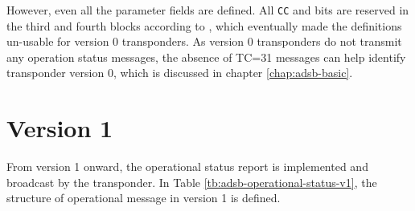 However, even all the parameter fields are defined. All 
\texttt{CC} and  bits are reserved in the third and fourth blocks according to \cite{icao9871v1}, which eventually made the definitions un-usable for version 0 transponders. As version 0 transponders do not transmit any operation status messages, the absence of TC=31 messages can help identify transponder version 0, which is discussed in chapter \ref{chap:adsb-basic}.

\section{Version 1}

From version 1 onward, the operational status report is implemented and broadcast by the transponder. In Table \ref{tb:adsb-operational-status-v1}, the structure of operational message in version 1 is defined.


